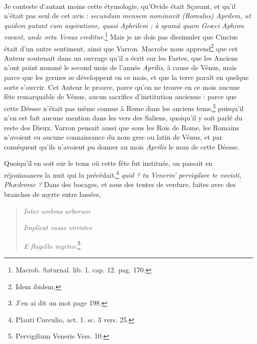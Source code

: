 \documentclass[a4paper, 18pt, oneside]{article}
\begin{document}
\paragraph{}
Je conteste d'autant moins cette étymologie, qu'Ovide était Sçavant, et qu'il n'était pas seul de cet avis : \emph{secundum mensem nominavit (Romulus) Aprilem, ut quidem putant cum aspiratione, quasi Aphrilem ; à spumâ quam Græci Aphron vocant, unde orta Venus creditur}.\footnote{Macrob. Saturnal. lib. 1. cap. 12. pag. 170.} Mais je ne dois pas dissimuler que Cincius était d'un autre sentiment, ainsi que Varron. Macrobe nous apprend\footnote{Idem ibidem.} que cet Auteur soutenait dans un ouvrage qu'il a écrit sur les Fastes, que les Anciens n'ont point nommé le second mois de l'année \emph{Aprilis}, à cause de Vénus, mais parce que les germes se développent en ce mois, et que la terre paraît en quelque sorte s'ouvrir. Cet Auteur le prouve, parce qu'on ne trouve en ce mois aucune fête remarquable de Vénus, aucun sacrifice d'institution ancienne : parce que cette Déesse n'était pas même connue à Rome dans les anciens tems,\footnote{J'en ai dit un mot page 198.} puisqu'il n'en est fait aucune mention dans les vers des Saliens, quoiqu'il y soit parlé du reste des Dieux. Varron pensait aussi que sous les Rois de Rome, les Romains n'avoient eu aucune connaissance du nom grec ou latin de Vénus, et par conséquent qu'ils n'avoient pu donner au mois \emph{Aprilis} le nom de cette Déesse.

Quoiqu'il en soit sur le tems où cette fête fut instituée, on passait en réjouissances la nuit qui la précédait,\footnote{Plauti Curculio, act. 1. sc. 3 vers. 25.} \emph{quid ? tu Venerin' pervigilare te vovisti, Phædrome ?} Dans des bocages, et sous des tentes de verdure, faites avec des branches de myrte entre lassées,
\begin{quotation}
\hspace*{5mm}\emph{Inter umbras arborum}

\emph{Implicat casas virentes}

\hspace*{5mm}\emph{E flagello myrteo.}\footnote{Pervigilium Veneris Vers. 10.}
\end{quotation}
\end{document}
